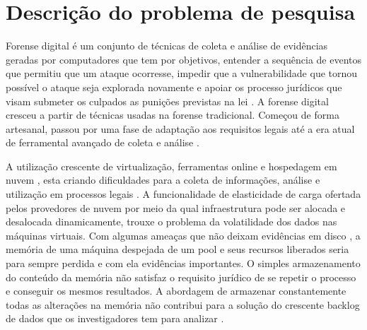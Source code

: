 \documentclass[12pt,				%
	openright,			%
	oneside,			%
	a4paper,			%
	english,			%
	brazil				%
	]{abntex2}
\begin{document}




\textual

\chapter{Descrição do problema de pesquisa} \label{chap:intro}
%
Forense digital é um conjunto de técnicas de coleta e análise de evidências geradas por computadores que tem por objetivos, entender a sequência de eventos que permitiu que um 
ataque ocorresse, impedir que a vulnerabilidade que tornou possível o ataque seja explorada novamente e apoiar os processo jurídicos que visam submeter os culpados as punições
previstas na lei \cite{Sang2013}. 
A forense digital cresceu a partir de técnicas usadas na forense tradicional. Começou de forma artesanal, passou por uma fase de adaptação aos requisitos legais até a era atual
de ferramental avançado de coleta e análise \cite{Charters2008}.

A utilização crescente de virtualização, ferramentas online e hospedagem em nuvem \cite{Amazon2016}, esta criando dificuldades para a coleta de informações, análise e utilização 
em processos legais \cite{Sharma2012}. A funcionalidade de elasticidade de carga ofertada pelos provedores de nuvem por meio da qual infraestrutura pode ser 
alocada e desalocada dinamicamente, trouxe o problema da volatilidade dos dados nas máquinas virtuais. Com algumas ameaças que não deixam evidências em disco \cite{Rafique2013}, 
a memória de uma máquina despejada de um pool e seus recursos liberados seria para sempre perdida e com ela evidências importantes. O simples armazenamento do conteúdo da memória
não satisfaz o requisito jurídico de se repetir o processo e conseguir os mesmos resultados. A abordagem de armazenar constantemente todas as alterações na memória não contribui 
para a solução do crescente backlog de dados que os investigadores tem para analizar \cite{Quick2014}. 
\end{document}

